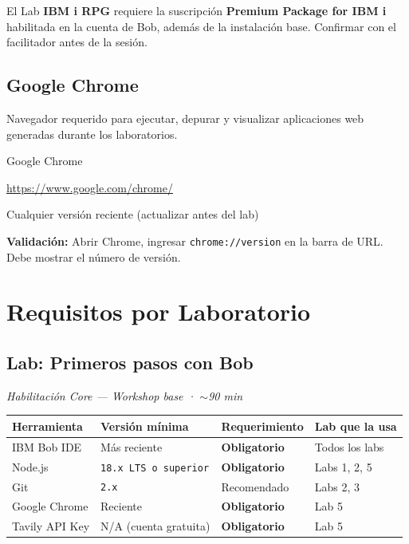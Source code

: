 \documentclass[11pt, a4paper]{article}
\newcommand{\version}[1]{\texttt{\textcolor{ibmblue}{#1}}}
\newcommand{\cmd}[1]{\texttt{\textcolor{ibmdark}{\small #1}}}
\newcommand{\req}[1]{\textbf{\textcolor{ibmred}{#1}}}
\newcommand{\checkmark}{\textcolor{ibmgreen}{\faCheckCircle}}
\begin{document}
\begin{criticalbox}
  El Lab \textbf{IBM i RPG} requiere la suscripción \textbf{Premium Package for IBM i} habilitada en la cuenta de Bob, además de la instalación base. Confirmar con el facilitador antes de la sesión.
\end{criticalbox}

\subsection{Google Chrome}

Navegador requerido para ejecutar, depurar y visualizar aplicaciones web generadas durante los laboratorios.

\begin{labbox}[ibmgray]{\faChrome\quad Google Chrome}
\begin{description}[leftmargin=3cm, style=nextline]
  \item[Descarga] \url{https://www.google.com/chrome/}
  \item[Versión] Cualquier versión reciente (actualizar antes del lab)
\end{description}
\vspace{6pt}
\textbf{Validación:} Abrir Chrome, ingresar \cmd{chrome://version} en la barra de URL. Debe mostrar el número de versión. \checkmark
\end{labbox}

\section{Requisitos por Laboratorio}

\subsection{Lab: Primeros pasos con Bob}
\label{sec:hands-on-inicial}

\textit{Habilitación Core — Workshop base · $\sim$90 min}

\vspace{4pt}
\begin{tabular}{@{}llll@{}}
\toprule
\textbf{Herramienta} & \textbf{Versión mínima} & \textbf{Requerimiento} & \textbf{Lab que la usa} \\
\midrule
IBM Bob IDE & Más reciente & \req{Obligatorio} & Todos los labs \\
Node.js & \version{18.x LTS o superior} & \req{Obligatorio} & Labs 1, 2, 5 \\
Git & \version{2.x} & Recomendado & Labs 2, 3 \\
Google Chrome & Reciente & \req{Obligatorio} & Lab 5 \\
Tavily API Key & N/A (cuenta gratuita) & \req{Obligatorio} & Lab 5 \\
\bottomrule
\end{tabular}
\end{document}

